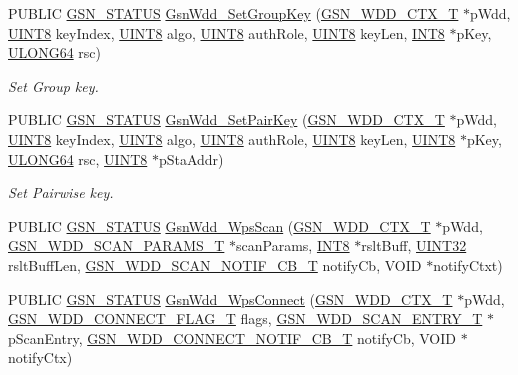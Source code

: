 \begin{DoxyCompactItemize}
\item 
PUBLIC \hyperlink{a00660_gada5951904ac6110b1fa95e51a9ddc217}{GSN\_\-STATUS} \hyperlink{a00677_gabc21d01bd143e531d2a989e46d60ab78}{GsnWdd\_\-SetGroupKey} (\hyperlink{a00108}{GSN\_\-WDD\_\-CTX\_\-T} $\ast$pWdd, \hyperlink{a00660_gab27e9918b538ce9d8ca692479b375b6a}{UINT8} keyIndex, \hyperlink{a00660_gab27e9918b538ce9d8ca692479b375b6a}{UINT8} algo, \hyperlink{a00660_gab27e9918b538ce9d8ca692479b375b6a}{UINT8} authRole, \hyperlink{a00660_gab27e9918b538ce9d8ca692479b375b6a}{UINT8} keyLen, \hyperlink{a00660_ga307b8734c020247f6bac4fcde0dcfbb9}{INT8} $\ast$pKey, \hyperlink{a00660_ga28961430434ccabca6862ea93fe9a15b}{ULONG64} rsc)
\begin{DoxyCompactList}\small\item\em Set Group key. \end{DoxyCompactList}\item 
PUBLIC \hyperlink{a00660_gada5951904ac6110b1fa95e51a9ddc217}{GSN\_\-STATUS} \hyperlink{a00677_gaf4ae3797779c34f09ecedbb97e1119ec}{GsnWdd\_\-SetPairKey} (\hyperlink{a00108}{GSN\_\-WDD\_\-CTX\_\-T} $\ast$pWdd, \hyperlink{a00660_gab27e9918b538ce9d8ca692479b375b6a}{UINT8} keyIndex, \hyperlink{a00660_gab27e9918b538ce9d8ca692479b375b6a}{UINT8} algo, \hyperlink{a00660_gab27e9918b538ce9d8ca692479b375b6a}{UINT8} authRole, \hyperlink{a00660_gab27e9918b538ce9d8ca692479b375b6a}{UINT8} keyLen, \hyperlink{a00660_gab27e9918b538ce9d8ca692479b375b6a}{UINT8} $\ast$pKey, \hyperlink{a00660_ga28961430434ccabca6862ea93fe9a15b}{ULONG64} rsc, \hyperlink{a00660_gab27e9918b538ce9d8ca692479b375b6a}{UINT8} $\ast$pStaAddr)
\begin{DoxyCompactList}\small\item\em Set Pairwise key. \end{DoxyCompactList}\item 
PUBLIC \hyperlink{a00660_gada5951904ac6110b1fa95e51a9ddc217}{GSN\_\-STATUS} \hyperlink{a00603_a4f2a67f095d578728b554cf374fa5e20}{GsnWdd\_\-WpsScan} (\hyperlink{a00108}{GSN\_\-WDD\_\-CTX\_\-T} $\ast$pWdd, \hyperlink{a00286}{GSN\_\-WDD\_\-SCAN\_\-PARAMS\_\-T} $\ast$scanParams, \hyperlink{a00660_ga307b8734c020247f6bac4fcde0dcfbb9}{INT8} $\ast$rsltBuff, \hyperlink{a00660_gae1e6edbbc26d6fbc71a90190d0266018}{UINT32} rsltBuffLen, \hyperlink{a00603_a4929f46818bd2e51f1d25fecc36d30d6}{GSN\_\-WDD\_\-SCAN\_\-NOTIF\_\-CB\_\-T} notifyCb, VOID $\ast$notifyCtxt)
\item 
PUBLIC \hyperlink{a00660_gada5951904ac6110b1fa95e51a9ddc217}{GSN\_\-STATUS} \hyperlink{a00603_a943626b18fe20d43cb25a52c09d92707}{GsnWdd\_\-WpsConnect} (\hyperlink{a00108}{GSN\_\-WDD\_\-CTX\_\-T} $\ast$pWdd, \hyperlink{a00677_ga3a599f8d47bbbf9108f9156cddf9bd4b}{GSN\_\-WDD\_\-CONNECT\_\-FLAG\_\-T} flags, \hyperlink{a00400}{GSN\_\-WDD\_\-SCAN\_\-ENTRY\_\-T} $\ast$pScanEntry, \hyperlink{a00603_afa291ab10917d97cae6b9207522e623b}{GSN\_\-WDD\_\-CONNECT\_\-NOTIF\_\-CB\_\-T} notifyCb, VOID $\ast$notifyCtx)

\end{DoxyCompactItemize}

